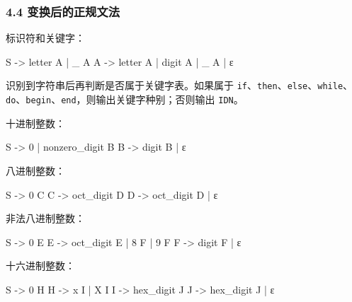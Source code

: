 \documentclass[
  a4paper,
  fontset=none,
]{ctexart}
\newenvironment{Shaded}{}{}
\newcommand{\NormalTok}[1]{#1}
\begin{document}
\hypertarget{ux53d8ux6362ux540eux7684ux6b63ux89c4ux6587ux6cd5}{%
\subsubsection{4.4
变换后的正规文法}\label{ux53d8ux6362ux540eux7684ux6b63ux89c4ux6587ux6cd5}}

标识符和关键字：

\begin{Shaded}
\begin{Highlighting}[]
\NormalTok{S {-}\textgreater{} letter A | \_ A}
\NormalTok{A {-}\textgreater{} letter A | digit A | \_ A | ε}
\end{Highlighting}
\end{Shaded}

识别到字符串后再判断是否属于关键字表。如果属于
\texttt{if}、\texttt{then}、\texttt{else}、\texttt{while}、\texttt{do}、\texttt{begin}、\texttt{end}，则输出关键字种别；否则输出
\texttt{IDN}。

十进制整数：

\begin{Shaded}
\begin{Highlighting}[]
\NormalTok{S {-}\textgreater{} 0 | nonzero\_digit B}
\NormalTok{B {-}\textgreater{} digit B | ε}
\end{Highlighting}
\end{Shaded}

八进制整数：

\begin{Shaded}
\begin{Highlighting}[]
\NormalTok{S {-}\textgreater{} 0 C}
\NormalTok{C {-}\textgreater{} oct\_digit D}
\NormalTok{D {-}\textgreater{} oct\_digit D | ε}
\end{Highlighting}
\end{Shaded}

非法八进制整数：

\begin{Shaded}
\begin{Highlighting}[]
\NormalTok{S {-}\textgreater{} 0 E}
\NormalTok{E {-}\textgreater{} oct\_digit E | 8 F | 9 F}
\NormalTok{F {-}\textgreater{} digit F | ε}
\end{Highlighting}
\end{Shaded}

十六进制整数：

\begin{Shaded}
\begin{Highlighting}[]
\NormalTok{S {-}\textgreater{} 0 H}
\NormalTok{H {-}\textgreater{} x I | X I}
\NormalTok{I {-}\textgreater{} hex\_digit J}
\NormalTok{J {-}\textgreater{} hex\_digit J | ε}
\end{Highlighting}
\end{Shaded}
\end{document}
